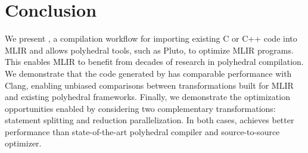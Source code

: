 \section{Conclusion}
We present \tool, a compilation workflow for importing existing C or C++ code into MLIR and allows polyhedral tools, such as Pluto, to optimize MLIR programs. This enables MLIR to benefit from decades of research in polyhedral compilation. We demonstrate that the code generated by \tool has comparable performance with Clang, enabling unbiased comparisons between transformations built for MLIR and existing polyhedral frameworks. 
Finally, we demonstrate the optimization opportunities enabled by \tool considering two complementary transformations: statement splitting and reduction parallelization. In both cases, \tool achieves better performance than state-of-the-art polyhedral compiler and source-to-source optimizer.

